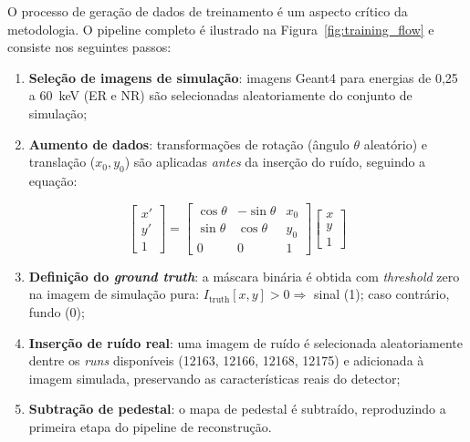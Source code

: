 \documentclass[
       oneside,
       english,
       brazil
       ]{abntbibufjf}
\begin{document}
O processo de geração de dados de treinamento é um aspecto crítico da
metodologia. O pipeline completo é ilustrado na
Figura~\ref{fig:training_flow} e consiste nos seguintes passos:

\begin{enumerate}
    \item \textbf{Seleção de imagens de simulação}: imagens Geant4 para
    energias de 0,25 a 60~keV (ER e NR) são selecionadas aleatoriamente do
    conjunto de simulação;
    \item \textbf{Aumento de dados}: transformações de rotação (ângulo
    $\theta$ aleatório) e translação ($x_0, y_0$) são aplicadas \emph{antes}
    da inserção do ruído, seguindo a equação:
\end{enumerate}

\begin{equation}
    \begin{bmatrix} x' \\ y' \\ 1 \end{bmatrix}
    =
    \begin{bmatrix}
        \cos\theta & -\sin\theta & x_0 \\
        \sin\theta &  \cos\theta & y_0 \\
        0          &  0          & 1
    \end{bmatrix}
    \begin{bmatrix} x \\ y \\ 1 \end{bmatrix}
    \label{eq:augmentation}
\end{equation}

\begin{enumerate}
    \setcounter{enumi}{2}
    \item \textbf{Definição do \textit{ground truth}}: a máscara binária é
    obtida com \textit{threshold} zero na imagem de simulação pura:
    $I_{\text{truth}}[x,y] > 0 \Rightarrow$ sinal (1); caso contrário,
    fundo (0);
    \item \textbf{Inserção de ruído real}: uma imagem de ruído é selecionada
    aleatoriamente dentre os \textit{runs} disponíveis (12163, 12166, 12168,
    12175) e adicionada à imagem simulada, preservando as características
    reais do detector;
    \item \textbf{Subtração de pedestal}: o mapa de pedestal é subtraído,
    reproduzindo a primeira etapa do pipeline de reconstrução.
\end{enumerate}
\end{document}
